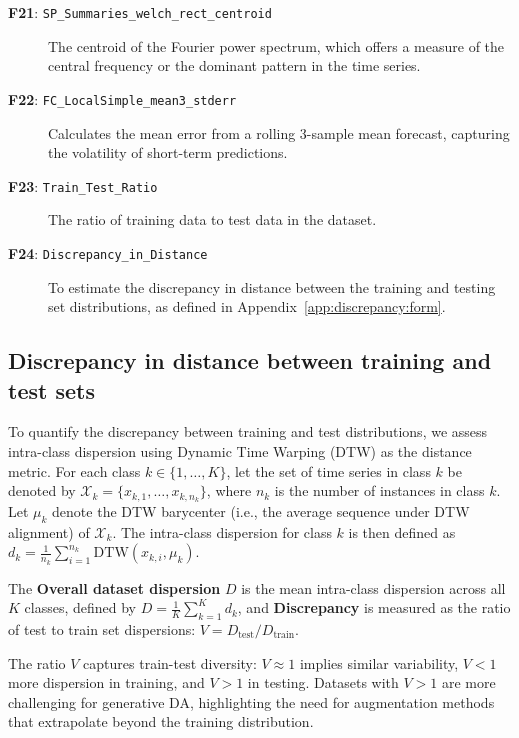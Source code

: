 {\begin{description}
    \item[\textbf{F21}: \texttt{SP\_Summaries\_welch\_rect\_centroid}] The centroid of the Fourier power spectrum, which offers a measure of the central frequency or the dominant pattern in the time series.
    
    \item[\textbf{F22}: \texttt{FC\_LocalSimple\_mean3\_stderr}] Calculates the mean error from a rolling 3-sample mean forecast, capturing the volatility of short-term predictions.
    
    \item[\textbf{F23}: \texttt{Train\_Test\_Ratio}] The ratio of training data to test data in the dataset.
    \item[\textbf{F24}: \texttt{Discrepancy\_in\_Distance}] To estimate the discrepancy in distance between the training and testing set distributions, as defined in Appendix~\ref{app:discrepancy:form}.
    \label{app:desc:tsf}
\end{description}
}

\subsection{Discrepancy in distance between training and test sets}\label{app:discrepancy}\label{app:discrepancy:form}
To quantify the discrepancy between training and test distributions, we assess intra-class dispersion using Dynamic Time Warping (DTW) as the distance metric. For each class \( k \in \{1, \ldots, K\} \), let the set of time series in class \( k \) be denoted by \( \mathcal{X}_k = \{x_{k,1}, \ldots, x_{k,n_k}\} \), where \( n_k \) is the number of instances in class \( k \). Let \( \mu_k \) denote the DTW barycenter (i.e., the average sequence under DTW alignment) of \( \mathcal{X}_k \). The intra-class dispersion for class \( k \) is then defined as $d_k = \frac{1}{n_k} \sum\nolimits_{i=1}^{n_k} \text{DTW}(x_{k,i}, \mu_k)$.

The \textbf{Overall dataset dispersion} \( D \) is the mean intra-class dispersion across all \( K \) classes, defined by $D = \frac{1}{K} \sum\nolimits_{k=1}^{K} d_k$, and \textbf{Discrepancy} is measured as the ratio of test to train set dispersions: $V = D_{\text{test}}/D_{\text{train}}$.

The ratio \( V \) captures train-test diversity: \( V \approx 1 \) implies similar variability, \( V < 1 \) more dispersion in training, and \( V > 1 \) in testing. Datasets with \( V > 1 \) are more challenging for generative DA, highlighting the need for augmentation methods that extrapolate beyond the training distribution.




